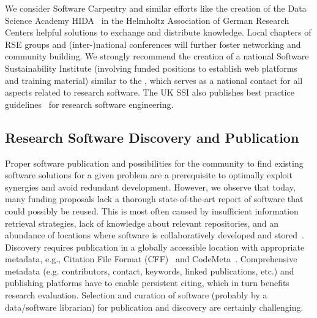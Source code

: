 \documentclass[a4paper,num-refs,numbers,sort&compress]{de-rse}
\begin{document}
We consider Software Carpentry and similar efforts like the creation of the Data Science Academy HIDA~\cite{HIDA} in the Helmholtz Association of German Research Centers helpful solutions to exchange and distribute knowledge. Local chapters of RSE groups and (inter-)national conferences will further foster networking and community building. We strongly recommend the creation of a national Software Sustainability Institute (involving funded positions to establish web platforms and training material) similar to the \cite{UKSoftwareSustainabilityInstitute}, which serves as a national contact for all aspects related to research software. The UK SSI also publishes best practice guidelines~\cite{SoftwareSystemsDevelopmentLifeCycle_SDLC} for research software engineering.

\subsection{Research Software Discovery and Publication}
Proper software publication and possibilities for the community to find existing software solutions for a given problem are a prerequisite to optimally exploit synergies and avoid redundant development. However, we observe that today, many funding proposals lack a thorough state-of-the-art report of software that could possibly be reused. This is most often caused by insufficient information retrieval strategies, lack of knowledge about relevant repositories, and an abundance of locations where software is collaboratively developed and stored~\cite{Struck2018}. Discovery requires publication in a globally accessible location with appropriate metadata, e.g., Citation File Format (CFF)~\cite{CFF} and CodeMeta~\cite{CodeMeta}. Comprehensive metadata (e.g. contributors, contact, keywords, linked publications, etc.) and publishing platforms have to enable persistent citing, which in turn benefits research evaluation. Selection and curation of software (probably by a data/software librarian) for publication and discovery are certainly challenging.
\end{document}
